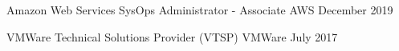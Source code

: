 

\begin{cventries}

  \cventry
    {Amazon Web Services SysOps Administrator - Associate} %
    {AWS} %
    {} %
    {December 2019} %
    {} %

  \cventry
    {VMWare Technical Solutions Provider (VTSP)} %
    {VMWare} %
    {} %
    {July 2017} %
    {} %

\end{cventries}

